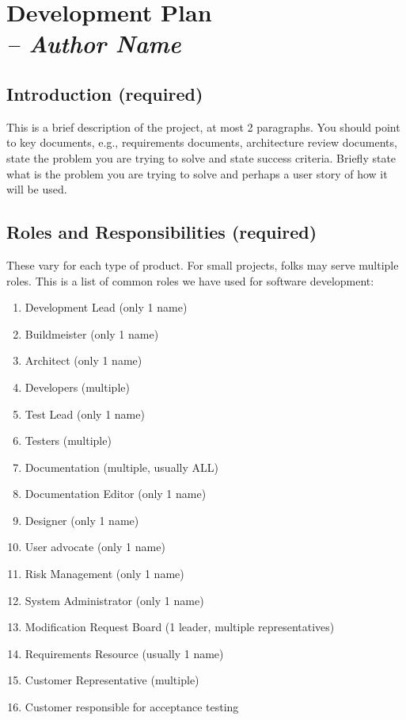 \chapter{Development Plan \\
\small{\textit{-- Author Name}}
\label{Chapter::DevelopmentPlan}}

\section{Introduction (required)}

This is a brief description of the project, at most 2 paragraphs.  You should point to key documents, e.g., requirements documents, architecture review documents, state the problem you are trying to solve and state success criteria. Briefly state what is the problem you are trying to solve and perhaps a user story of how it will be used.

\section{Roles and Responsibilities (required)}
These vary for each type of product. For small projects, folks may serve multiple roles.  This is a list of common roles we have used for software development: 
 
\begin{enumerate}
\item Development Lead (only 1 name) 
\item Buildmeister (only 1 name) 
\item Architect (only 1 name) 
\item Developers (multiple) 
\item Test Lead (only 1 name) 
\item Testers (multiple) 
\item Documentation (multiple, usually ALL) 
\item Documentation Editor (only 1 name) 
\item Designer (only 1 name) 
\item User advocate (only 1 name) 
\item Risk Management (only 1 name) 
\item System Administrator (only 1 name) 
\item Modification Request Board (1 leader, multiple representatives) 
\item Requirements Resource (usually 1 name) 
\item Customer Representative (multiple) 
\item Customer responsible for acceptance testing
\end{enumerate}

